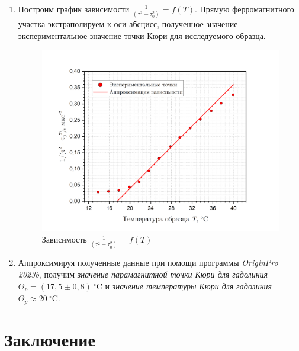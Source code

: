 \documentclass[a4paper, 12pt]{article}
\begin{document}
\begin{enumerate}
        \item Построим график зависимости $\frac{1}{(\tau^2-\tau_0^2)} = f(T)$. Прямую ферромагнитного участка экстраполируем к оси абсцисс, полученное значение -- экспериментальное значение точки Кюри для исследуемого образца. 
    
        \begin{figure}[H]
            \centering
            \includegraphics[scale = 0.45]{images/graph_Curie_Weiss.png}
            \caption{Зависимость $\frac{1}{(\tau^2-\tau_0^2)} = f(T)$}
            \label{graph}
        \end{figure}
    
        \item Аппроксимируя полученные данные при помощи программы \textit{OriginPro 2023b}, получим \textit{значение парамагнитной точки Кюри для гадолиния} $\Theta_p = \left( 17,5 \pm 0,8 \right) \: ^{\circ}$C и \textit{значение температуры Кюри для гадолиния} $\Theta_p \approx 20 \: ^{\circ}$C.
    \end{enumerate}

    
    \section{Заключение}
\end{document}
